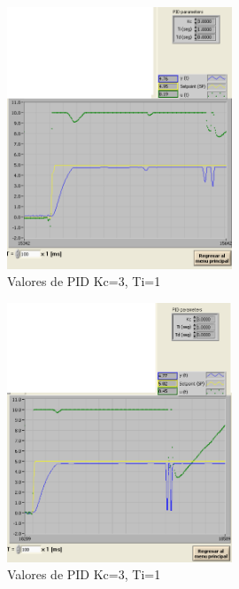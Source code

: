 \documentclass[]{article}
\begin{document}
\begin{figure}[h!]
	\centering
	\includegraphics[width=0.6\textwidth]{Imagenes/signalActividad4A}
	\caption{Valores de PID Kc=3, Ti=1}
	\label{fig:signalActividad4A}
\end{figure}

\begin{figure}[h!]
	\centering
	\includegraphics[width=0.6\textwidth]{Imagenes/signalActividad4b}
	\caption{Valores de PID Kc=3, Ti=1}
	\label{fig:signalActividad4b}
\end{figure}
\end{document}
